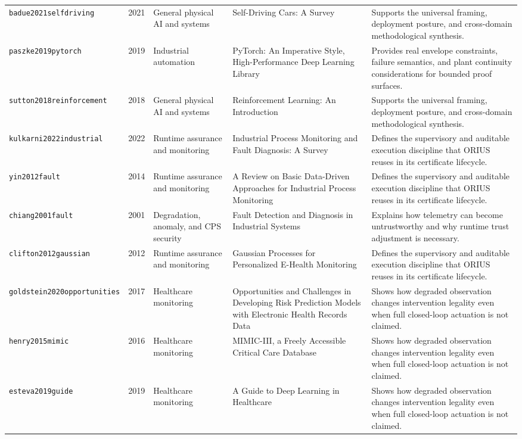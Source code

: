 \begin{longtable}{p{}p{}p{}p{}p{}}
\texttt{badue2021selfdriving} & 2021 & General physical AI and systems & Self-Driving Cars: A Survey & Supports the universal framing, deployment posture, and cross-domain methodological synthesis.\\
\texttt{paszke2019pytorch} & 2019 & Industrial automation & PyTorch: An Imperative Style, High-Performance Deep Learning Library & Provides real envelope constraints, failure semantics, and plant continuity considerations for bounded proof surfaces.\\
\texttt{sutton2018reinforcement} & 2018 & General physical AI and systems & Reinforcement Learning: An Introduction & Supports the universal framing, deployment posture, and cross-domain methodological synthesis.\\
\texttt{kulkarni2022industrial} & 2022 & Runtime assurance and monitoring & Industrial Process Monitoring and Fault Diagnosis: A Survey & Defines the supervisory and auditable execution discipline that ORIUS reuses in its certificate lifecycle.\\
\texttt{yin2012fault} & 2014 & Runtime assurance and monitoring & A Review on Basic Data-Driven Approaches for Industrial Process Monitoring & Defines the supervisory and auditable execution discipline that ORIUS reuses in its certificate lifecycle.\\
\texttt{chiang2001fault} & 2001 & Degradation, anomaly, and CPS security & Fault Detection and Diagnosis in Industrial Systems & Explains how telemetry can become untrustworthy and why runtime trust adjustment is necessary.\\
\texttt{clifton2012gaussian} & 2012 & Runtime assurance and monitoring & Gaussian Processes for Personalized E-Health Monitoring & Defines the supervisory and auditable execution discipline that ORIUS reuses in its certificate lifecycle.\\
\texttt{goldstein2020opportunities} & 2017 & Healthcare monitoring & Opportunities and Challenges in Developing Risk Prediction Models with Electronic Health Records Data & Shows how degraded observation changes intervention legality even when full closed-loop actuation is not claimed.\\
\texttt{henry2015mimic} & 2016 & Healthcare monitoring & MIMIC-III, a Freely Accessible Critical Care Database & Shows how degraded observation changes intervention legality even when full closed-loop actuation is not claimed.\\
\texttt{esteva2019guide} & 2019 & Healthcare monitoring & A Guide to Deep Learning in Healthcare & Shows how degraded observation changes intervention legality even when full closed-loop actuation is not claimed.\\

\end{longtable}
